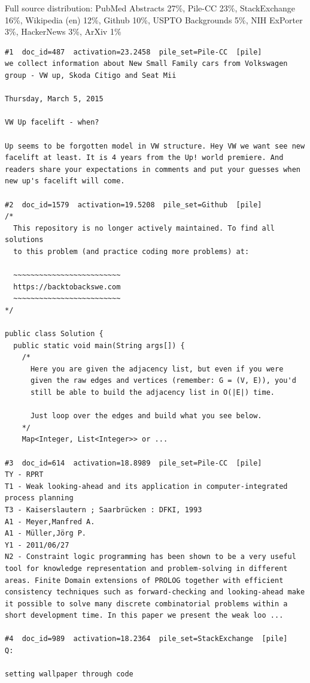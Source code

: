 Full source distribution: PubMed Abstracts 27\%, Pile-CC 23\%, StackExchange 16\%, Wikipedia (en) 12\%, Github 10\%, USPTO Backgrounds 5\%, NIH ExPorter 3\%, HackerNews 3\%, ArXiv 1\%

\begin{verbatim}
#1  doc_id=487  activation=23.2458  pile_set=Pile-CC  [pile]
we collect information about New Small Family cars from Volkswagen group - VW up, Skoda Citigo and Seat Mii

Thursday, March 5, 2015

VW Up facelift - when?

Up seems to be forgotten model in VW structure. Hey VW we want see new facelift at least. It is 4 years from the Up! world premiere. And readers share your expectations in comments and put your guesses when new up's facelift will come.

#2  doc_id=1579  activation=19.5208  pile_set=Github  [pile]
/*
  This repository is no longer actively maintained. To find all solutions
  to this problem (and practice coding more problems) at:

  ~~~~~~~~~~~~~~~~~~~~~~~~~
  https://backtobackswe.com
  ~~~~~~~~~~~~~~~~~~~~~~~~~
*/

public class Solution {
  public static void main(String args[]) {
    /*
      Here you are given the adjacency list, but even if you were
      given the raw edges and vertices (remember: G = (V, E)), you'd
      still be able to build the adjacency list in O(|E|) time.

      Just loop over the edges and build what you see below.
    */
    Map<Integer, List<Integer>> or ...

#3  doc_id=614  activation=18.8989  pile_set=Pile-CC  [pile]
TY - RPRT
T1 - Weak looking-ahead and its application in computer-integrated process planning
T3 - Kaiserslautern ; Saarbrücken : DFKI, 1993
A1 - Meyer,Manfred A.
A1 - Müller,Jörg P.
Y1 - 2011/06/27
N2 - Constraint logic programming has been shown to be a very useful tool for knowledge representation and problem-solving in different areas. Finite Domain extensions of PROLOG together with efficient consistency techniques such as forward-checking and looking-ahead make it possible to solve many discrete combinatorial problems within a short development time. In this paper we present the weak loo ...

#4  doc_id=989  activation=18.2364  pile_set=StackExchange  [pile]
Q:

setting wallpaper through code


\end{verbatim}

